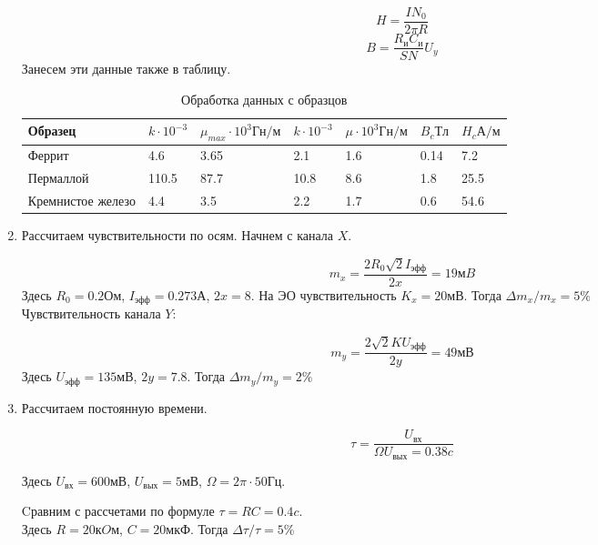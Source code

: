 \documentclass[12pt,a4paper]{article}
\begin{document}
\begin{enumerate}
\begin{equation}
    H = \frac{IN_0}{2\pi R}
\end{equation}
\begin{equation}
    B = \frac{R_иC_и}{SN}U_y
\end{equation}
Занесем эти данные также в таблицу.

\begin{table}[H]
    \centering
    \begin{center}
    \end{center}
    \vspace{0.1cm}
    \label{tab:my_label}
    \begin{tabular}{ |p{2cm}|p{1.5cm}|p{3cm}|p{1.5cm}|p{2cm}|p{1cm}|p{1.3cm}|}
 \hline
 Образец & $k\cdot10^{-3}$ & $\mu_{max}\cdot10^{3} Гн/м$ & $k\cdot10^{-3}$ & $\mu\cdot10^{3} Гн/м$ & $B_c Тл$ & $H_c А/м$ \\
 \hline
    Феррит & 4.6 & 3.65 & 2.1 & 1.6 & 0.14 & 7.2\\
 \hline
    Пермаллой & 110.5 & 87.7 & 10.8 & 8.6 & 1.8& 25.5\\
   \hline
    Кремнистое железо & 4.4 & 3.5 & 2.2 & 1.7 & 0.6 & 54.6\\
\hline
\end{tabular}
\caption{Обработка данных с образцов}
\end{table}

\item Рассчитаем чувствительности по осям. Начнем с канала $X$. 

\begin{equation}
    m_x = \frac{2R_0\sqrt{2}I_{эфф}}{2x} = 19 мB
\end{equation}   
Здесь $R_0 = 0.2 Ом$, $I_{эфф} = 0.273 А$, $2x = 8$. На ЭО  чувствительность $K_x = 20 мВ$. Тогда $\Delta m_x / m_x = 5\% $ 
\\ Чувствительность канала $Y$:

\begin{equation}
    m_y = \frac{2\sqrt{2}KU_{эфф}}{2y} = 49 мВ
\end{equation}
Здесь $U_{эфф} = 135 мВ$, $2y = 7.8$. Тогда $\Delta m_y / m_y = 2\% $ 

\item Рассчитаем постоянную времени.

\begin{equation}
    \tau = \frac{U_{вх}}{\varOmega U_{вых} = 0.38 c}
\end{equation}

Здесь $U_{вх} = 600 мВ$, $U_{вых} = 5 мВ$, $\varOmega = 2 \pi \cdot 50 Гц$.

Cравним с рассчетами по формуле $\tau = RC = 0.4 c$. \\
Здесь $R = 20 кOм$, $C = 20 мкФ$. Тогда $\Delta \tau / \tau = 5\%$

\end{enumerate}
\end{document}
